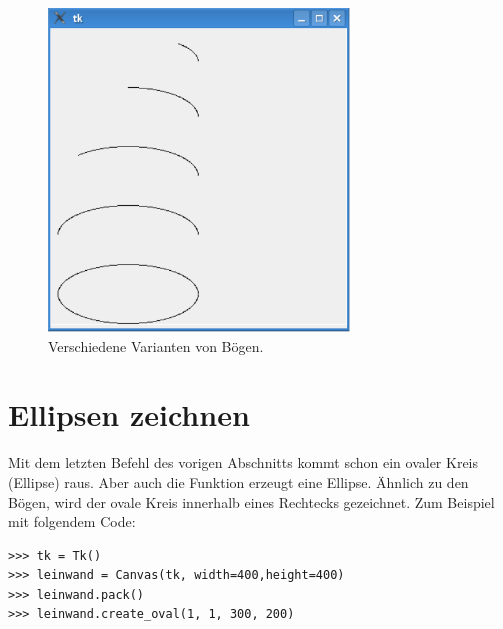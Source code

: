 \begin{figure}
\begin{center}
\includegraphics[width=80mm]{images/figure37}
\end{center}
\caption{Verschiedene Varianten von Bögen.}\label{fig37}
\end{figure}

\section{Ellipsen zeichnen}

Mit dem letzten Befehl des vorigen Abschnitts kommt schon ein ovaler Kreis (Ellipse) raus. Aber auch die Funktion  erzeugt eine Ellipse. Ähnlich zu den Bögen, wird der ovale Kreis innerhalb eines Rechtecks gezeichnet. Zum Beispiel mit folgendem Code:

\begin{Verbatim}[frame=single]
>>> tk = Tk()
>>> leinwand = Canvas(tk, width=400,height=400)
>>> leinwand.pack()
>>> leinwand.create_oval(1, 1, 300, 200)
\end{Verbatim}

